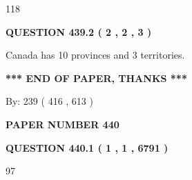 \documentclass[12pt]{article}
\begin{document}
  
 
 
\noindent{}

118
 
 
  
\vspace{0.2in}
  
{\textbf{\Large{QUESTION
439.2 
 ( 2 , 2 , 3 )
}}}
  
  
 
 
\noindent{}
 
 
Canada has 10  provinces and 3 territories.
 
 
 
 
   
   
 \vspace{0.2in}
 
   
   
   
   
\vspace{1.0in} 
{\textbf{\large{ *** END OF PAPER, THANKS *** }}} 
   
   
\hspace{1.0in} By: 
 239 ( 416 ,  613 )
   
   
   
   
\newpage 
\setcounter{page}{ 
   440001 } 
   
   
   
   
 {\textbf{ \Large{ PAPER NUMBER  440  }}}
   
   
\vspace{0.2in}
   
   
   
   
   
   
 \vspace{0.2in}
 
 
 
 
   
   
  
\vspace{0.2in}
  
{\textbf{\Large{QUESTION
440.1 
 ( 1 , 1 , 6791 )
}}}
  
  
 
 
\noindent{}

97
 
\end{document}

